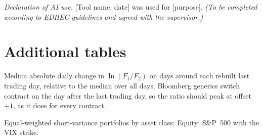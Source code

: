 \documentclass[11pt,a4paper]{article}
\theoremstyle{remark}
\newcommand{\note}[1]{\par\smallskip\parbox{\linewidth}{\footnotesize #1}}
\begin{document}
\bigskip
\noindent\textit{Declaration of AI use.} [Tool name, date] was used for [purpose]. \textit{(To be completed according to EDHEC guidelines and agreed with the supervisor.)}




\appendix
\section{Additional tables}

\begin{table}[H]
\centering
\caption{Validation of the contract calendars}
\label{tab:calendar}
\small

\note{Median absolute daily change in $\ln(F_1/F_2)$ on days around each rebuilt last trading day, relative to the median over all days. Bloomberg generics switch contract on the day after the last trading day, so the ratio should peak at offset $+1$, as it does for every contract.}
\end{table}

\begin{table}[H]
\centering
\caption{Correlation of monthly returns of asset-class portfolios}
\label{tab:corr}
\small

\note{Equal-weighted short-variance portfolios by asset class; Equity: S\&P~500 with the VIX strike.}
\end{table}
\end{document}
